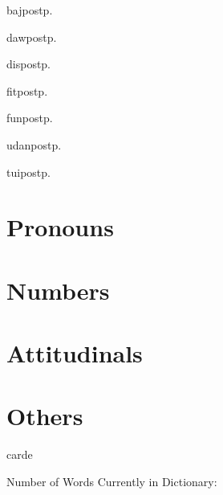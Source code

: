 \begin{multicols*}{2}
\begin{description}[leftmargin=*]
    \begin{dictentry}{baj}{postp.}
    \end{dictentry}
    \begin{dictentry}{daw}{postp.}
    \end{dictentry}
    \begin{dictentry}{dis}{postp.}
    \end{dictentry}
    \begin{dictentry}{fit}{postp.}
    \end{dictentry}
    \begin{dictentry}{fun}{postp.}
    \end{dictentry}
    \begin{dictentry}{udan}{postp.}
    \end{dictentry}
    \begin{dictentry}{tui}{postp.}
    \end{dictentry}
\end{description}

\section{Pronouns}

\section{Numbers}

\section{Attitudinals}

\section{Others}

\begin{description}[leftmargin=*]
    \begin{dictentry}{carde}{}
    \end{dictentry}
\end{description}

\end{multicols*}
\vspace{\fill}
Number of Words Currently in Dictionary: \thedictwordcount